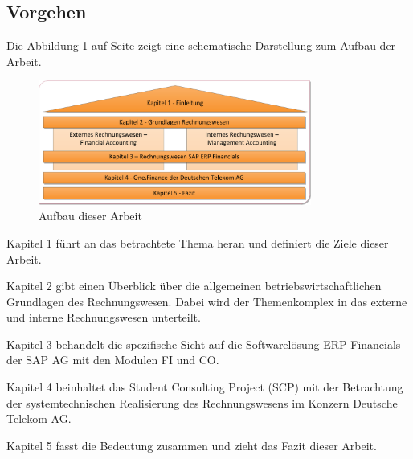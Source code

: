 \subsection{Vorgehen}
Die Abbildung \ref{abbeinleitung} auf Seite \pageref{abbeinleitung} zeigt eine schematische Darstellung zum Aufbau der Arbeit.
\begin{figure}[htbp]
\begin{center}
\includegraphics[width=0.8\textwidth]{Images/einleitung.png}
\caption[Aufbau dieser Arbeit]{Aufbau dieser Arbeit}
\label{abbeinleitung}
\end{center}
\end{figure}
\begin{compactitem}
\item Kapitel 1 führt an das betrachtete Thema heran und definiert die Ziele dieser Arbeit.
\item Kapitel 2 gibt einen Überblick über die allgemeinen betriebswirtschaftlichen Grundlagen des Rechnungswesen. Dabei wird der Themenkomplex in das externe und interne Rechnungswesen unterteilt.
\item Kapitel 3 behandelt die spezifische Sicht auf die Softwarelösung ERP Financials der SAP AG mit den Modulen FI und CO.
\item Kapitel 4 beinhaltet das Student Consulting Project (SCP) mit der Betrachtung der systemtechnischen Realisierung des Rechnungswesens im Konzern Deutsche Telekom AG.
\item Kapitel 5 fasst die Bedeutung zusammen und zieht das Fazit dieser Arbeit.
\end{compactitem}
